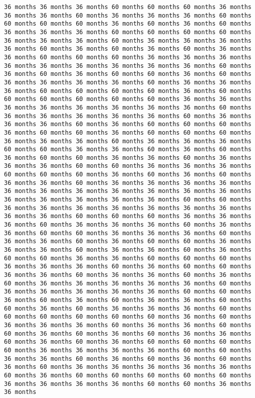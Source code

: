 \documentclass[11pt]{article}
\begin{document}
\begin{Verbatim}[commandchars=\\\{\}, frame=single, framerule=2mm, rulecolor=\color{outerrorbackground}]
36 months 36 months 36 months 60 months 60 months 60 months 36 months 36 months 36 months 60 months 36 months 36 months 36 months 60 months 60 months 60 months 60 months 36 months 60 months 36 months 60 months 36 months 36 months 36 months 60 months 60 months 60 months 60 months 36 months 36 months 36 months 60 months 36 months 36 months 36 months 36 months 60 months 36 months 60 months 36 months 60 months 36 months 36 months 60 months 60 months 60 months 36 months 36 months 36 months 36 months 36 months 36 months 36 months 36 months 36 months 60 months 36 months 60 months 36 months 60 months 60 months 36 months 60 months 36 months 36 months 36 months 36 months 60 months 36 months 36 months 36 months 60 months 60 months 60 months 60 months 36 months 60 months 60 months 60 months 60 months 60 months 60 months 36 months 36 months 36 months 36 months 36 months 36 months 36 months 36 months 60 months 36 months 36 months 36 months 36 months 36 months 60 months 36 months 36 months 36 months 60 months 36 months 60 months 60 months 60 months 36 months 60 months 60 months 36 months 60 months 60 months 60 months 36 months 36 months 36 months 60 months 36 months 36 months 36 months 60 months 60 months 36 months 36 months 60 months 36 months 60 months 36 months 60 months 60 months 36 months 36 months 60 months 36 months 36 months 36 months 60 months 60 months 36 months 36 months 36 months 60 months 60 months 60 months 36 months 60 months 36 months 60 months 36 months 36 months 60 months 36 months 36 months 36 months 36 months 36 months 36 months 36 months 36 months 36 months 36 months 36 months 36 months 36 months 36 months 36 months 36 months 60 months 60 months 36 months 36 months 36 months 36 months 36 months 36 months 36 months 36 months 36 months 60 months 60 months 60 months 36 months 36 months 36 months 60 months 36 months 36 months 36 months 60 months 36 months 36 months 60 months 60 months 36 months 36 months 36 months 60 months 36 months 36 months 60 months 36 months 60 months 60 months 36 months 36 months 36 months 60 months 36 months 36 months 60 months 36 months 60 months 60 months 36 months 36 months 60 months 60 months 60 months 36 months 36 months 36 months 60 months 36 months 60 months 60 months 36 months 36 months 60 months 36 months 36 months 60 months 36 months 60 months 36 months 36 months 36 months 36 months 36 months 60 months 36 months 36 months 36 months 36 months 36 months 60 months 60 months 36 months 60 months 36 months 60 months 36 months 36 months 60 months 60 months 36 months 60 months 36 months 36 months 36 months 60 months 60 months 60 months 60 months 60 months 60 months 36 months 60 months 36 months 36 months 36 months 60 months 36 months 36 months 60 months 60 months 36 months 60 months 36 months 60 months 36 months 36 months 60 months 36 months 60 months 36 months 60 months 60 months 60 months 60 months 36 months 36 months 36 months 36 months 60 months 60 months 36 months 36 months 60 months 36 months 60 months 36 months 60 months 36 months 60 months 36 months 36 months 36 months 36 months 36 months 60 months 36 months 60 months 60 months 60 months 60 months 60 months 36 months 36 months 36 months 36 months 60 months 60 months 36 months 36 months 
\end{Verbatim}
\end{document}
